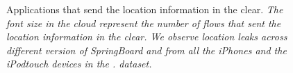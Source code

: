 \begin{figure}[tb]
\newline
{}
\caption{Applications that send the location information in the clear. \emph{The font size in the cloud represent the number of flows that sent the location information in the clear. We observe location leaks across different version of SpringBoard and from all the iPhones and the iPodtouch devices in the \mobWild. dataset.}}
\label{fig:location-wordcloud}
\vspace{\postfigspace}
\end{figure}

